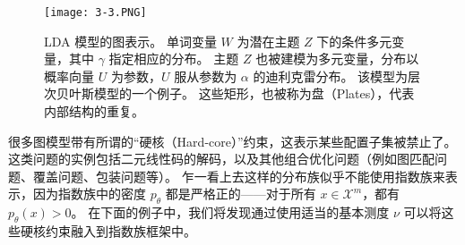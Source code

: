 \begin{figure}[htbp]
    \centering
    \texttt{[image: 3-3.PNG]}
    \caption{
        LDA 模型的图表示。
        单词变量 $W$ 为潜在主题 $Z$ 下的条件多元变量，其中 $\gamma$ 指定相应的分布。
        主题 $Z$ 也被建模为多元变量，分布以概率向量 $U$ 为参数，$U$ 服从参数为 $\alpha$ 的迪利克雷分布。
        该模型为层次贝叶斯模型的一个例子。
        这些矩形，也被称为盘（Plates），代表内部结构的重复。
    }\label{fig:3-3}
\end{figure}

很多图模型带有所谓的“硬核（Hard-core）”约束，这表示某些配置子集被禁止了。
这类问题的实例包括二元线性码的解码，以及其他组合优化问题（例如图匹配问题、覆盖问题、包装问题等）。
乍一看上去这样的分布族似乎不能使用指数族来表示，因为指数族中的密度 $p_{\theta}$ 都是严格正的——对于所有 $x \in \mathcal{X}^m$，都有 $p_{\theta}(x) > 0$。
在下面的例子中，我们将发现通过使用适当的基本测度 $\nu$ 可以将这些硬核约束融入到指数族框架中。

